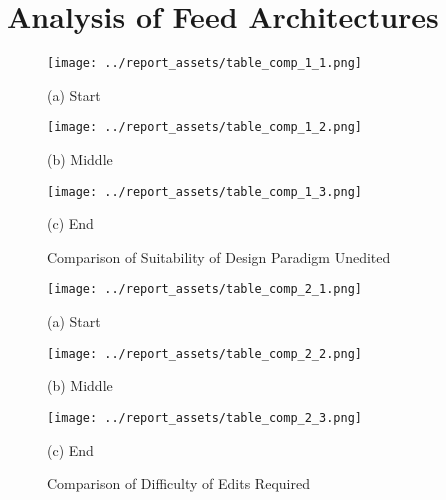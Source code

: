 \chapter{Analysis of Feed Architectures}\label{appendix:feed-architecture-analysis}

\begin{figure}[htbp]
    \centering

    \begin{minipage}{0.5\textwidth}
        \centering
        \texttt{[image: ../report\_assets/table\_comp\_1\_1.png]}
        \caption{(a) Start}
    \end{minipage}
    \begin{minipage}{0.5\textwidth}
        \centering
        \texttt{[image: ../report\_assets/table\_comp\_1\_2.png]}
        \caption{(b) Middle}
    \end{minipage}
    \begin{minipage}{0.5\textwidth}
        \centering
        \texttt{[image: ../report\_assets/table\_comp\_1\_3.png]}
        \caption{(c) End}
    \end{minipage}
    \caption{Comparison of Suitability of Design Paradigm Unedited}
\end{figure}

\begin{figure}[htbp]
    \centering

    \begin{minipage}{0.5\textwidth}
        \centering
        \texttt{[image: ../report\_assets/table\_comp\_2\_1.png]}
        \caption{(a) Start}
    \end{minipage}
    \begin{minipage}{0.5\textwidth}
        \centering
        \texttt{[image: ../report\_assets/table\_comp\_2\_2.png]}
        \caption{(b) Middle}
    \end{minipage}
    \begin{minipage}{0.5\textwidth}
        \centering
        \texttt{[image: ../report\_assets/table\_comp\_2\_3.png]}
        \caption{(c) End}
    \end{minipage}
    \caption{Comparison of Difficulty of Edits Required}
\end{figure}

